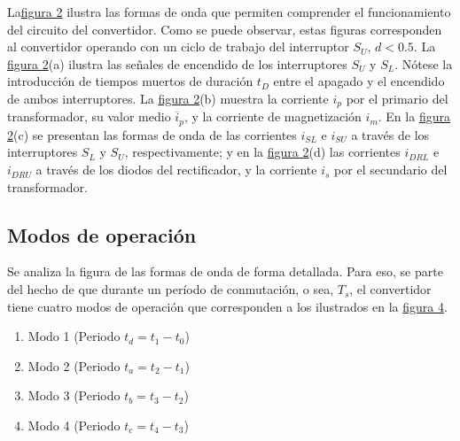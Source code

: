 La\hyperref[fig:formaonda1]{figura 2} ilustra las formas de onda que permiten comprender el funcionamiento del circuito del convertidor. Como se puede observar, estas figuras corresponden al convertidor operando con un ciclo de trabajo del interruptor \( S_U \), \( d < 0.5 \). La \hyperref[fig:formaonda1]{figura 2}(a) ilustra las señales de encendido de los interruptores \( S_U \) y \( S_L \). Nótese la introducción de tiempos muertos de duración \( t_D \) entre el apagado y el encendido de ambos interruptores. La \hyperref[fig:formaonda1]{figura 2}(b) muestra la corriente \( i_p \) por el primario del transformador, su valor medio \( \overline{i}_p \), y la corriente de magnetización \( i_m \). En la \hyperref[fig:formaonda1]{figura 2}(c) se presentan las formas de onda de las corrientes \( i_{SL} \) e \( i_{SU} \) a través de los interruptores \( S_L \) y \( S_U \), respectivamente; y en la \hyperref[fig:formaonda1]{figura 2}(d) las corrientes \( i_{DRL} \) e \( i_{DRU} \) a través de los diodos del rectificador, y la corriente \( i_s \) por el secundario del transformador.

\subsection{Modos de operación}

Se analiza la figura de las formas de onda de forma detallada. Para eso, se parte del hecho de que durante un período de conmutación, o sea, $T_s$, el convertidor tiene cuatro modos de operación que corresponden a los ilustrados en la \hyperref[fig:modosoperacion]{figura 4}.

\begin{enumerate}
	\item Modo 1 (Periodo \( t_d = t_1 - t_0 \))
	\item Modo 2 (Periodo \( t_a = t_2 - t_1 \))
	\item Modo 3 (Periodo \( t_b = t_3 - t_2 \))
	\item Modo 4 (Periodo \( t_c = t_4 - t_3 \))
\end{enumerate}

